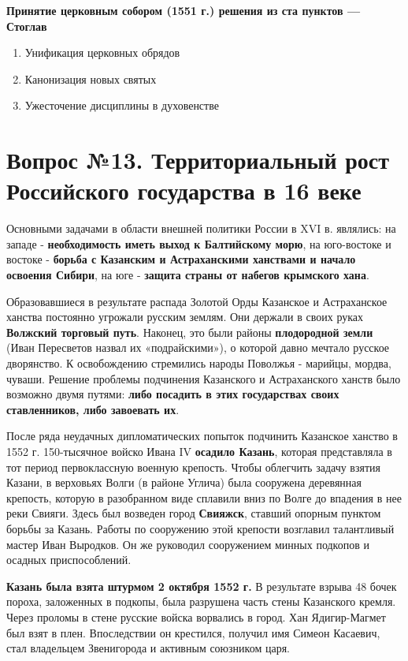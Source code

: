 \documentclass{article}
\begin{document}
\textbf{Принятие церковным собором (1551 г.) решения из ста пунктов — Стоглав}

\begin{enumerate}
    \item Унификация церковных обрядов
    \item Канонизация новых святых
    \item Ужесточение дисциплины в духовенстве
\end{enumerate}

\pagebreak
\section{Вопрос №13. Территориальный рост Российского государства в 16 веке}

Основными задачами в области внешней политики России в XVI в. являлись: на западе - \textbf{необходимость иметь выход к Балтийскому морю}, на юго-востоке и востоке - \textbf{борьба с Казанским и Астраханскими ханствами и начало освоения Сибири}, на юге - \textbf{защита страны от набегов крымского хана}.

\hfill


Образовавшиеся в результате распада Золотой Орды Казанское и Астраханское ханства постоянно угрожали русским землям. Они держали в своих руках \textbf{Волжский торговый путь}. Наконец, это были районы \textbf{плодородной земли} (Иван Пересветов назвал их «подрайскими»), о которой давно мечтало русское дворянство. К освобождению стремились народы Поволжья - марийцы, мордва, чуваши. Решение проблемы подчинения Казанского и Астраханского ханств было возможно двумя путями: \textbf{либо посадить в этих государствах своих ставленников, либо завоевать их}.

\hfill

После ряда неудачных дипломатических попыток подчинить Казанское ханство в 1552 г. 150-тысячное войско Ивана IV \textbf{осадило Казань}, которая представляла в тот период первоклассную военную крепость. Чтобы облегчить задачу взятия Казани, в верховьях Волги (в районе Углича) была сооружена деревянная крепость, которую в разобранном виде сплавили вниз по Волге до впадения в нее реки Свияги. Здесь был возведен город \textbf{Свияжск}, ставший опорным пунктом борьбы за Казань. Работы по сооружению этой крепости возглавил талантливый мастер Иван Выродков. Он же руководил сооружением минных подкопов и осадных приспособлений.

\hfill

\textbf{Казань была взята штурмом 2 октября 1552 г.} В результате взрыва 48 бочек пороха, заложенных в подкопы, была разрушена часть стены Казанского кремля. Через проломы в стене русские войска ворвались в город. Хан Ядигир-Магмет был взят в плен. Впоследствии он крестился, получил имя Симеон Касаевич, стал владельцем Звенигорода и активным союзником царя.
\end{document}
